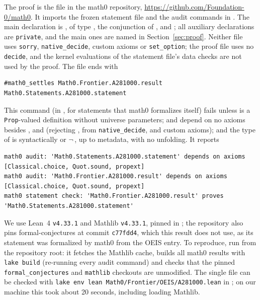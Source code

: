 \documentclass[11pt]{amsart}
\theoremstyle{plain}
\theoremstyle{definition}
\begin{document}
The proof is the file  in the math0 repository, \url{https://github.com/Foundation-0/math0}. It imports the frozen statement file and the audit commands in . The main declaration is , of type , the conjunction of ,  and ; all auxiliary declarations are \texttt{private}, and the main ones are named in Section~\ref{sec:proof}. Neither file uses \texttt{sorry}, \texttt{native\_decide}, custom axioms or \texttt{set\_option}; the proof file uses no \texttt{decide}, and the kernel evaluations of the statement file's data checks are not used by the proof. The file ends with
\begin{lstlisting}
#math0_settles Math0.Frontier.A281000.result Math0.Statements.A281000.statement
\end{lstlisting}
This command (in , for statements that math0 formalizes itself) fails unless  is a \texttt{Prop}-valued definition without universe parameters;  and  depend on no axioms besides ,  and  (rejecting ,  from \texttt{native\_decide}, and custom axioms); and the type of  is syntactically  or $\neg$\,, up to metadata, with no unfolding. It reports
\begin{lstlisting}[basicstyle=\ttfamily\scriptsize]
math0 audit: 'Math0.Statements.A281000.statement' depends on axioms [Classical.choice, Quot.sound, propext]
math0 audit: 'Math0.Frontier.A281000.result' depends on axioms [Classical.choice, Quot.sound, propext]
math0 statement check: 'Math0.Frontier.A281000.result' proves 'Math0.Statements.A281000.statement'
\end{lstlisting}
We use Lean~4 \cite{Lean4} \texttt{v4.33.1} and Mathlib \cite{Mathlib} \texttt{v4.33.1}, pinned in ; the repository also pins formal-conjectures \cite{FC} at commit \texttt{c77fdd4}, which this result does not use, as its statement was formalized by math0 from the OEIS entry. To reproduce, run  from the repository root: it fetches the Mathlib cache, builds all math0 results with \texttt{lake build} (re-running every audit command) and checks that the pinned \texttt{formal\_conjectures} and \texttt{mathlib} checkouts are unmodified. The single file can be checked with \texttt{lake env lean Math0/Frontier/OEIS/A281000.lean} in ; on our machine this took about 20 seconds, including loading Mathlib.
\end{document}
